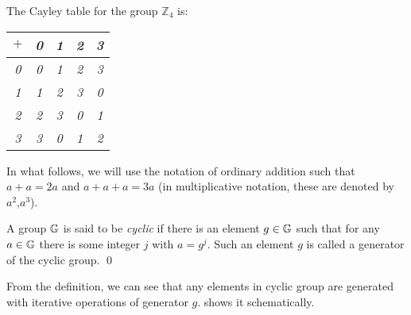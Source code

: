 \begin{example}The Cayley table for the group $\mathbb{Z}_4$ is:
\begin{center}
\begin{tabular}{c|cccc}
        $+$&\em 0&\em 1&\em 2&\em 3       \\
\hline
        \em 0&\em 0&\em 1&\em 2&\em 3       \\
        \em 1&\em 1&\em 2&\em 3&\em 0       \\
        \em 2&\em 2&\em 3&\em 0&\em 1       \\
        \em 3&\em 3&\em 0&\em 1&\em 2       \\
\end{tabular}
\end{center}
\end{example}

In what follows, we will use the notation of ordinary addition such that $a+a=2a$ and $a+a+a=3a$ (in multiplicative notation, these are denoted by $a^2$,$a^3$).

\begin{definition}
A group $\mathbb{G}\index{group}$ is said to be {\em cyclic} if there is an element $g\in\mathbb{G}\index{group}$ such that for any $a\in\mathbb{G}\index{group}$ there is some integer $j$ with $a=g^{j}$. Such an element $g$ is called a generator of the cyclic group. \qed
\end{definition}

From the definition, we can see that any elements in cyclic group are generated with iterative operations of generator $g$.  shows it schematically.

